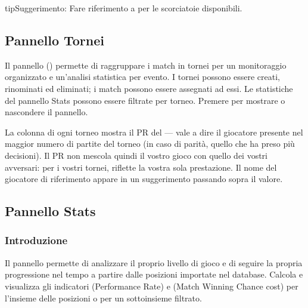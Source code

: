 \documentclass[letterpaper,10pt,italian]{sphinxmanual}
\begin{document}
\begin{sphinxadmonition}{tip}{Suggerimento:}
\sphinxAtStartPar
Fare riferimento a {\hyperref[\detokenize{raccourcis:raccourcis}]{}} per le scorciatoie disponibili.
\end{sphinxadmonition}


\subsection{Pannello Tornei}
\label{\detokenize{manuel:panneau-tournois}}\label{\detokenize{manuel:id8}}
\sphinxAtStartPar
Il pannello  () permette di raggruppare i match in tornei per un monitoraggio organizzato e un’analisi statistica per evento. I tornei possono essere creati, rinominati ed eliminati; i match possono essere assegnati ad essi. Le statistiche del pannello Stats possono essere filtrate per torneo. Premere  per mostrare o nascondere il pannello.

\sphinxAtStartPar
La colonna  di ogni torneo mostra il PR del  — vale a dire il giocatore presente nel maggior numero di partite del torneo (in caso di parità, quello che ha preso più decisioni). Il PR non mescola quindi il vostro gioco con quello dei vostri avversari: per i vostri tornei, riflette la vostra sola prestazione. Il nome del giocatore di riferimento appare in un suggerimento passando sopra il valore.


\subsection{Pannello Stats}
\label{\detokenize{manuel:panneau-stats}}\label{\detokenize{manuel:stats}}

\subsubsection{Introduzione}
\label{\detokenize{manuel:id9}}
\sphinxAtStartPar
Il pannello  permette di analizzare il proprio livello di gioco e di seguire la propria progressione nel tempo a partire dalle posizioni importate nel database. Calcola e visualizza gli indicatori  (Performance Rate) e  (Match Winning Chance cost) per l’insieme delle posizioni o per un sottoinsieme filtrato.
\end{document}

